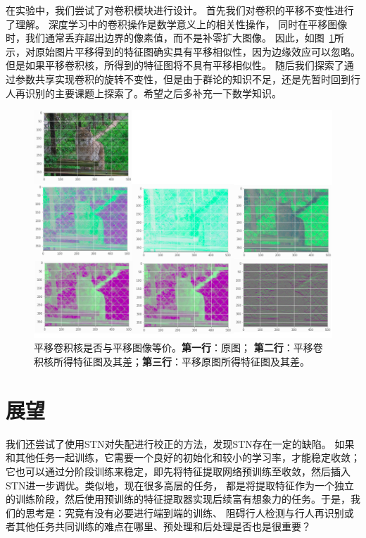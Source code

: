 在实验中，我们尝试了对卷积模块进行设计。
首先我们对卷积的平移不变性进行了理解。
深度学习中的卷积操作是数学意义上的相关性操作，
同时在平移图像时，我们通常丢弃超出边界的像素值，而不是补零扩大图像。
因此，如图~\ref{fig:gconv}所示，对原始图片平移得到的特征图确实具有平移相似性，因为边缘效应可以忽略。
但是如果平移卷积核，所得到的特征图将不具有平移相似性。
随后我们探索了通过参数共享实现卷积的旋转不变性，但是由于群论的知识不足，还是先暂时回到行人再识别的主要课题上探索了。希望之后多补充一下数学知识。

\begin{figure}
	\centering
\includegraphics[width=\textwidth]{fig/2018-05-21-10-51-51.png}	
		\caption{平移卷积核是否与平移图像等价。\textbf{第一行}：原图；
		\textbf{第二行}：平移卷积核所得特征图及其差；\textbf{第三行}：平移原图所得特征图及其差。}
		\label{fig:gconv}
\end{figure}

\section{展望}

我们还尝试了使用STN对失配进行校正的方法，发现STN存在一定的缺陷。
如果和其他任务一起训练，它需要一个良好的初始化和较小的学习率，才能稳定收敛；
它也可以通过分阶段训练来稳定，即先将特征提取网络预训练至收敛，然后插入STN进一步调优。类似地，现在很多高层的任务，
都是将提取特征作为一个独立的训练阶段，然后使用预训练的特征提取器实现后续富有想象力的任务。于是，我们的思考是：究竟有没有必要进行端到端的训练、
阻碍行人检测与行人再识别或者其他任务共同训练的难点在哪里、预处理和后处理是否也是很重要？

